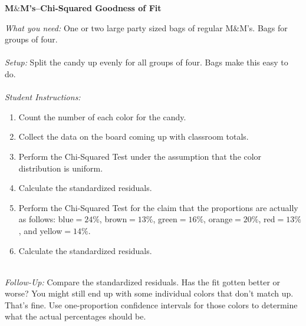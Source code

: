 \documentclass[12pt]{amsart}
\theoremstyle{definition}
\begin{document}
      \begin{framed}
      	\begin{center} \textbf{M$\&$M's--Chi-Squared Goodness of Fit} \end{center}
      	\emph{What you need:} One or two large party sized bags of regular M$\&$M's. Bags for groups of four.\\
      	~\\
      	\emph{Setup:} Split the candy up evenly for all groups of four. Bags make this easy to do.\\
      	~\\
      	\emph{Student Instructions:} 
      	\begin{enumerate}
      		\item Count the number of each color for the candy.
      		\item Collect the data on the board coming up with classroom totals.
      		\item Perform the Chi-Squared Test under the assumption that the color distribution is uniform.
      		\item Calculate the standardized residuals.
      		\item Perform the Chi-Squared Test for the claim that the proportions are actually as follows: blue$=24\%$, brown$=13\%$, green$=16\%$, orange$=20\%$, red$=13\%$, and yellow$=14\%$.
      		\item Calculate the standardized residuals.
      	\end{enumerate}
      	~\\
      	\emph{Follow-Up:} Compare the standardized residuals. Has the fit gotten better or worse? You might still end up with some individual colors that don't match up. That's fine. Use one-proportion confidence intervals for those colors to determine what the actual percentages should be.
      \end{framed}
      \newpage
      
\end{document}
